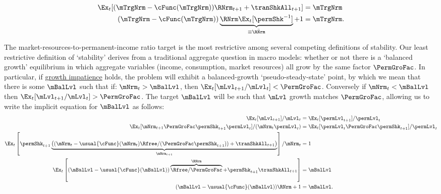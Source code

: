 \documentclass[BufferStockTheory]{subfiles}
\begin{document}
\begin{equation} \label{eq:mTargImplicit}
  \begin{split}
    \Ex_{t} [(\mTrgNrm-\cFunc(\mTrgNrm))\RNrm_{t+1}+\tranShkAll_{t+1}] & = \mTrgNrm     \\   (\mTrgNrm-\cFunc(\mTrgNrm))\underbrace{\RNrm\Ex_{t}[\permShk^{-1}]}_{\equiv \bar{\RNrm}}+1 & = \mTrgNrm .
  \end{split}
\end{equation}

\hypertarget{Collective-Stability}{}
\hypertarget{pseudo-steady-state}{}

The market-resources-to-permanent-income ratio target is the most restrictive among several competing definitions of stability. Our least restrictive definition of `stability' derives from a traditional aggregate question in macro models: whether or not there is a `balanced growth' equilibrium in which aggregate variables (income, consumption, market resources) all grow by the same factor $\PermGroFac$. In particular, if \hyperlink{GICRaw}{growth impatience} holds, the problem will exhibit a balanced-growth `pseudo-steady-state' point, by which we mean that there is some ${\mBalLvl}$ such that if:
\hypertarget{balgrostable}{}
\hypertarget{balgrostableSolve}{}
$\mNrm_{t}>{\mBalLvl}$, then $\Ex_{t}[\mLvl_{t+1}/\mLvl_{t}] < \PermGroFac$. Conversely if $\mNrm_{t}<{\mBalLvl}$ then $\Ex_{t}[\mLvl_{t+1}/\mLvl_{t}] > \PermGroFac$. The target $\mBalLvl$ will be such that $\mLvl$ growth matches $\PermGroFac$, allowing us to write the implicit equation for $\mBalLvl$ as follows:
%
%
\begin{equation}\label{eq:balgrostable}
  \begin{split}
    \Ex_{t}[\mLvl_{t+1}]/\mLvl_{t} & =\Ex_{t}[\permLvl_{t+1}]/\permLvl_{t}
    \\  \Ex_{t}[\mNrm_{t+1}\PermGroFac\permShk_{t+1}\permLvl_{t}]/(\mNrm_{t}\permLvl_{t}) & =\Ex_{t}[\permLvl_{t}\PermGroFac\permShk_{t+1}]/\permLvl_{t}
    \\ \Ex_{t}\left[\permShk_{t+1}\underbrace{\left((\mNrm_{t}-\usual{\cFunc}(\mNrm_{t})\Rfree/(\PermGroFac\permShk_{t+1}))+\tranShkAll_{t+1}\right)}_{\mNrm_{t+1}}\right]/\mNrm_{t} & = 1
    \\ 
    \Ex_{t}\left[(\mBalLvl-\usual{\cFunc}(\mBalLvl))\overbrace{\Rfree/\PermGroFac}^{\RNrm}+\permShk_{t+1}\tranShkAll_{t+1}\right] & = \mBalLvl
    \\  (\mBalLvl-\usual{\cFunc}(\mBalLvl))\RNrm+ 1 & = \mBalLvl .
  \end{split}
\end{equation}
\end{document}
